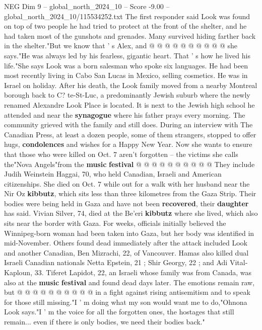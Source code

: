 \begin{textsample}{NEG Dim 9 – global\_north\_2024\_10 – Score -9.00 – global\_north\_2024\_10/115534252.txt}
The first responder said Look was found on top of two people he had tried to protect at the front of the shelter, and he had taken most of the gunshots and grenades.
Many survived hiding farther back in the shelter."But we know that ' s Alex, and @ @ @ @ @ @ @ @ @ @ she says."He was always led by his fearless, gigantic heart.
That ' s how he lived his life."She says Look was a born salesman who spoke six languages.
He had been most recently living in Cabo San Lucas in Mexico, selling cosmetics.
He was in Israel on holiday.
After his death, the Look family moved from a nearby Montreal borough back to C? te-St-Luc, a predominantly Jewish suburb where the newly renamed Alexandre Look Place is located.
It is next to the Jewish high school he attended and near the \textbf{synagogue} where his father prays every morning.
The community grieved with the family and still does.
During an interview with The Canadian Press, at least a dozen people, some of them strangers, stopped to offer hugs, \textbf{condolences} and wishes for a Happy New Year.
Now she wants to ensure that those who were killed on Oct. 7 aren't forgotten -- the victims she calls the"Nova Angels"from the \textbf{music} \textbf{festival} @ @ @ @ @ @ @ @ @ @ They include Judih Weinstein Haggai, 70, who held Canadian, Israeli and American citizenships.
She died on Oct. 7 while out for a walk with her husband near the Nir Oz \textbf{kibbutz}, which sits less than three kilometres from the Gaza Strip.
Their bodies were being held in Gaza and have not been \textbf{recovered}, their \textbf{daughter} has said.
Vivian Silver, 74, died at the Be'eri \textbf{kibbutz} where she lived, which also sits near the border with Gaza.
For weeks, officials initially believed the Winnipeg-born woman had been taken into Gaza, but her body was identified in mid-November.
Others found dead immediately after the attack included Look and another Canadian, Ben Mizrachi, 22, of Vancouver.
Hamas also killed dual Israeli Canadian nationals Netta Epstein, 21 ; Shir Georgy, 22 ; and Adi Vital-Kaploun, 33.
Tiferet Lapidot, 22, an Israeli whose family was from Canada, was also at the \textbf{music} \textbf{festival} and found dead days later.
The emotions remain raw, but @ @ @ @ @ @ @ @ @ @ in a fight against rising antisemitism and to speak for those still missing."I ' m doing what my son would want me to do,"Ohnona Look says."I ' m the voice for all the forgotten ones, the hostages that still remain... even if there is only bodies, we need their bodies back."

\end{textsample}
